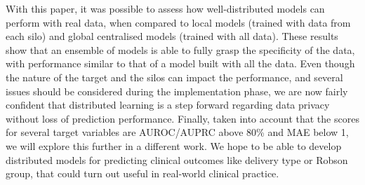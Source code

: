With this paper, it was possible to assess how well-distributed models can perform with real data, when compared to local models (trained with data from each silo) and global centralised models (trained with all data). These results show that an ensemble of models is able to fully grasp the specificity of the data, with performance similar to that of a model built with all the data. Even though the nature of the target and the silos can impact the performance, and several issues should be considered during the implementation phase, we are now fairly confident that distributed learning is a step forward regarding data privacy without loss of prediction performance.
Finally, taken into account that the scores for several target variables are AUROC/AUPRC above 80\% and MAE below 1, we will explore this further in a different work. We hope to be able to develop distributed models for predicting clinical outcomes like delivery type or Robson group, that could turn out useful in real-world clinical practice.

